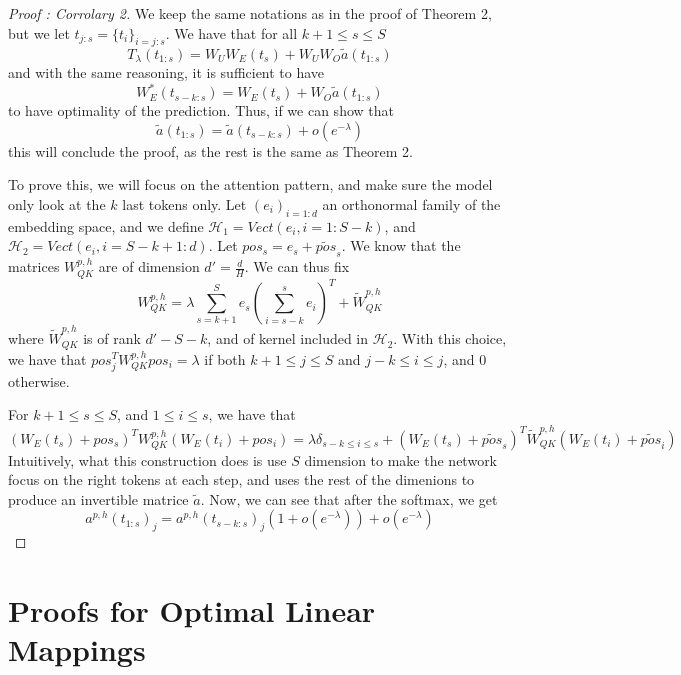 \documentclass{article}
\begin{document}
\begin{proof}[Proof : Corrolary 2]
    We keep the same notations as in the proof of Theorem 2, but we let $t_{j:s} = \{t_i\}_{i=j:s}$. We have that for all 
    $k+1\leq s\leq S$\[T_{\lambda}(t_{1:s}) = W_UW_E(t_{s}) + W_UW_O\tilde{a}(t_{1:s})\] and with the same reasoning, it is sufficient to have 
    \[W_E^*(t_{s-k:s}) = W_E(t_{s}) + W_O\tilde{a}(t_{1:s})\] to have optimality of the prediction. Thus, if we can show that 
    \[\tilde{a}(t_{1:s}) = \tilde{a}(t_{s-k:s}) + o(e^{-\lambda})\] this will conclude the proof, as the rest is the same as Theorem 2.
    \bigbreak

    To prove this, we will focus on the attention pattern, and make sure the model only look at the $k$ last tokens only. Let $(e_i)_{i=1:d}$ 
    an orthonormal family of the embedding space, and we define $\mathcal{H}_1 = Vect(e_i, i=1:S-k)$, and $\mathcal{H}_2 = Vect(e_i, i=S-k+1:d)$.
    Let $pos_s = e_s + \tilde{pos}_s$.
    We know that the matrices $W_{QK}^{p,h}$ are of dimension $d'=\frac{d}{H}$. We can thus fix 
    \[W_{QK}^{p,h} = \lambda\sum_{s=k+1}^Se_s\left(\sum_{i=s-k}^se_{i}\right)^T + \tilde{W}_{QK}^{p,h}\] where $\tilde{W}_{QK}^{p,h}$ is of rank
    $d'-S-k$, and of kernel included in $\mathcal{H}_2$. With this choice, we have that 
    $pos_j^TW_{QK}^{p,h}pos_i = \lambda$ if both $k+1\leq j\leq S$ and $j-k\leq i\leq j$, and $0$ otherwise.
    \bigbreak

    For $k+1\leq s \leq S$, and $1\leq i\leq s$, we have that 
    \[(W_E(t_s)+ pos_s)^TW_{QK}^{p,h}(W_E(t_i)+pos_i) = \lambda\delta_{s-k\leq i\leq s} + (W_E(t_s) + \tilde{pos}_s)^T\tilde{W}_{QK}^{p,h}(W_E(t_i)+ \tilde{pos}_i)\] 
    Intuitively, what this construction does is use $S$ dimension to make the network focus on the right tokens at each step, and uses the rest 
    of the dimenions to produce an invertible matrice $\tilde{a}$. Now, we can see that after the softmax, we get 
    \[a^{p,h}(t_{1:s})_j = a^{p,h}(t_{s-k:s})_j(1+o(e^{-\lambda}))+o(e^{-\lambda})\] 
\end{proof}

\section{Proofs for Optimal Linear Mappings}
\end{document}
